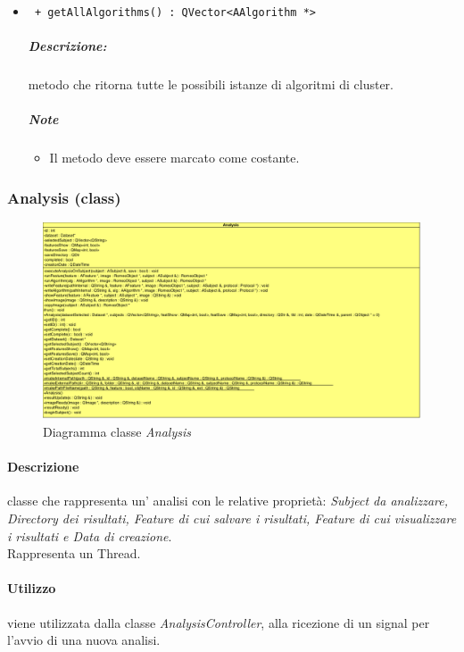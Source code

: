 \begin{itemize}
	\item \color{blue}\verb! + getAllAlgorithms() : QVector<AAlgorithm *>!
	\color{black}
	\subparagraph{Descrizione:} metodo che ritorna tutte le possibili istanze di algoritmi di cluster\g{}.
	\subparagraph{Note}
		\begin{itemize}
			\item Il metodo deve essere marcato come costante.
		\end{itemize}
		
	\end{itemize}
	
\pagebreak
\color{black}
\subsubsection{Analysis (class)}
	\label{analysis}
	\begin{figure}[!h]
	\centering
				\includegraphics[scale=0.5]{./Content/Immagini/modelCore/Analysis.png}
				\caption{Diagramma classe \textsl{Analysis}}
				\label{analysis_img}
	\end{figure}

\paragraph{Descrizione \\}
classe che rappresenta un' analisi con le relative proprietà: \emph{Subject\g{} da analizzare, Directory dei risultati, Feature\g{} di cui salvare i risultati, Feature\g{} di cui visualizzare i risultati e Data di creazione}.
\\Rappresenta un Thread.

\paragraph{Utilizzo \\}
viene utilizzata dalla classe \textsl{AnalysisController}, alla ricezione di un signal\g{} per l'avvio di una nuova analisi.

